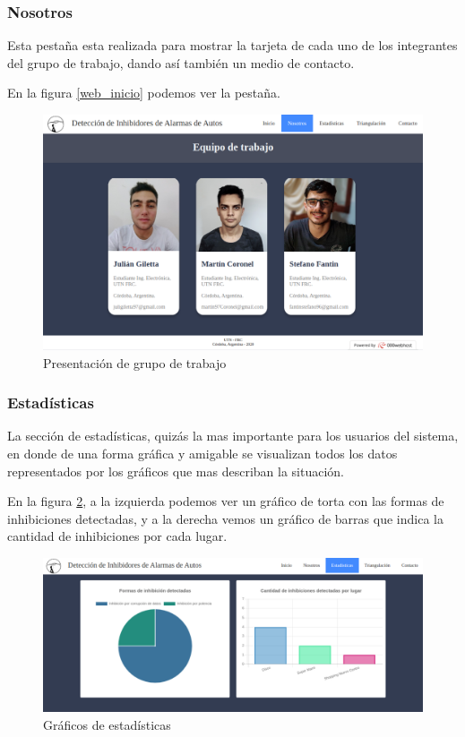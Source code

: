 \subsubsection{Nosotros}
Esta pestaña esta realizada para mostrar la tarjeta de cada uno de los integrantes del grupo de trabajo, dando así también un medio de contacto.
\par En la figura \ref{web_inicio} podemos ver la pestaña. 
\begin{figure}[h!]
	\centering
	\includegraphics[scale=0.3]{images/web/nosotros-web.png}
    \caption{Presentación de grupo de trabajo}
	\label{web_nos}
\end{figure}
\subsubsection{Estadísticas}
La sección de estadísticas, quizás la mas importante para los usuarios del sistema, en donde de una forma gráfica y amigable se visualizan todos los datos representados por los gráficos que mas describan la situación. 
\par En la figura \ref{web_est}, a la izquierda podemos ver un gráfico de torta con las formas de inhibiciones detectadas, y a la derecha vemos un gráfico de barras que indica la cantidad de inhibiciones por cada lugar. 
\begin{figure}[h!]
	\centering
	\includegraphics[scale=0.3]{images/web/est-web.png}
    \caption{Gráficos de estadísticas}
	\label{web_est}
\end{figure}

